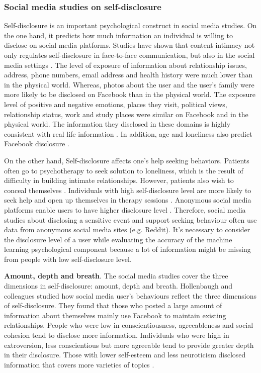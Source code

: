 \subsubsection{Social media studies on self-disclosure}
Self-disclosure is an important psychological construct in social media studies. On the one hand, it predicts how much information an individual is willing to disclose on social media platforms. Studies have shown that content intimacy not only regulates self-disclosure in face-to-face communication, but also in the social media settings \cite{ma_anonymity_2016}. The level of exposure of information about relationship issues, address, phone numbers, email address and health history were much lower than in the physical world. Whereas, photos about the user and the user's family were more likely to be disclosed on Facebook than in the physical world. The exposure level of positive and negative emotions, places they visit, political views, relationship status, work and study places were similar on Facebook and in the physical world. The information they disclosed in these domains is highly consistent with real life information \cite{villela2015contrasting}. In addition, age and loneliness also predict Facebook disclosure \cite{malik2016uses}. 


On the other hand, Self-disclosure affects one's help seeking behaviors. Patients often go to psychotherapy to seek solution to loneliness, which is the result of difficulty in building intimate relationships. However, patients also wish to conceal themselves \cite{fisher1990shared, stricker1990self}.  Individuals with high self-disclosure level are more likely to seek help and open up themselves in therapy sessions \cite{hinson1993willingness}. Anonymous social media platforms enable users to have higher disclosure level \cite{andalibi_announcing_2018}. Therefore, social media studies about disclosing a sensitive event and support seeking behaviour often use data from anonymous social media sites (e.g. Reddit). It's necessary to consider the disclosure level of a user while evaluating the accuracy of the machine learning psychological component because a lot of information might be missing from people with low self-disclosure level.


\textbf{Amount, depth and breath}. The social media studies cover the three dimensions in self-disclosure: amount, depth and breath. Hollenbaugh and colleagues studied how social media user's behaviours reflect the three dimensions of self-disclosure. They found that those who posted a large amount of information about themselves mainly use Facebook to maintain existing relationships. People who were low in conscientiousness, agreeableness and social cohesion tend to disclose more information. Individuals who were high in extroversion, less conscientious but more agreeable tend to provide greater depth in their disclosure. Those with lower self-esteem and less neuroticism disclosed information that covers more varieties of topics \cite{hollenbaugh_facebook_2014}.

